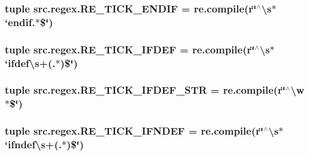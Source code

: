 \hypertarget{namespacesrc_1_1regex_a3adb11d0fc5bf8a49bc769375563bbfd}{
\subsubsection[{R\-E\-\_\-\-T\-I\-C\-K\-\_\-\-E\-N\-D\-I\-F}]{\setlength{\rightskip}{0pt plus 5cm}tuple src.\-regex.\-R\-E\-\_\-\-T\-I\-C\-K\-\_\-\-E\-N\-D\-I\-F = re.\-compile(r\char`\"{}$^\wedge$\textbackslash{}s$\ast$`endif.$\ast$\$\char`\"{})}}\label{namespacesrc_1_1regex_a3adb11d0fc5bf8a49bc769375563bbfd}
\hypertarget{namespacesrc_1_1regex_ade2998c2e2b41720cd6cdf9776cd28de}{
\subsubsection[{R\-E\-\_\-\-T\-I\-C\-K\-\_\-\-I\-F\-D\-E\-F}]{\setlength{\rightskip}{0pt plus 5cm}tuple src.\-regex.\-R\-E\-\_\-\-T\-I\-C\-K\-\_\-\-I\-F\-D\-E\-F = re.\-compile(r\char`\"{}$^\wedge$\textbackslash{}s$\ast$`ifdef\textbackslash{}s+(.$\ast$)\$\char`\"{})}}\label{namespacesrc_1_1regex_ade2998c2e2b41720cd6cdf9776cd28de}
\hypertarget{namespacesrc_1_1regex_a615e332e4311b59420bcb3aeab332527}{
\subsubsection[{R\-E\-\_\-\-T\-I\-C\-K\-\_\-\-I\-F\-D\-E\-F\-\_\-\-S\-T\-R}]{\setlength{\rightskip}{0pt plus 5cm}tuple src.\-regex.\-R\-E\-\_\-\-T\-I\-C\-K\-\_\-\-I\-F\-D\-E\-F\-\_\-\-S\-T\-R = re.\-compile(r\char`\"{}$^\wedge$\textbackslash{}w$\ast$\$\char`\"{})}}\label{namespacesrc_1_1regex_a615e332e4311b59420bcb3aeab332527}
\hypertarget{namespacesrc_1_1regex_ac8f063a17b1525cb2e13b5e5ebdabee2}{
\subsubsection[{R\-E\-\_\-\-T\-I\-C\-K\-\_\-\-I\-F\-N\-D\-E\-F}]{\setlength{\rightskip}{0pt plus 5cm}tuple src.\-regex.\-R\-E\-\_\-\-T\-I\-C\-K\-\_\-\-I\-F\-N\-D\-E\-F = re.\-compile(r\char`\"{}$^\wedge$\textbackslash{}s$\ast$`ifndef\textbackslash{}s+(.$\ast$)\$\char`\"{})}}\label{namespacesrc_1_1regex_ac8f063a17b1525cb2e13b5e5ebdabee2}
